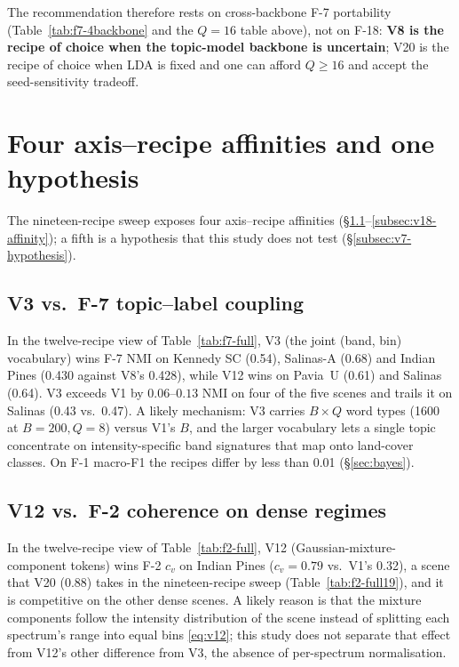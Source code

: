 \documentclass[journal,a4paper,10pt]{IEEEtran}
\begin{document}
The recommendation therefore rests on cross-backbone F-7 portability
(Table~\ref{tab:f7-4backbone} and the $Q = 16$ table above), not on
F-18: \textbf{V8 is the recipe of choice when the topic-model backbone
is uncertain}; V20 is the recipe of choice when LDA is fixed and one
can afford $Q \geq 16$ and accept the seed-sensitivity tradeoff.

\section{Four axis--recipe affinities and one hypothesis}\label{sec:affinities}

The nineteen-recipe sweep exposes four axis--recipe
affinities (\S\ref{subsec:v3-affinity}--\ref{subsec:v18-affinity}); a
fifth is a hypothesis that this study does not test
(\S\ref{subsec:v7-hypothesis}).

\subsection{V3 vs.\ F-7 topic--label coupling}
\label{subsec:v3-affinity}
In the twelve-recipe view of Table~\ref{tab:f7-full}, V3 (the joint
(band, bin) vocabulary) wins F-7 NMI on Kennedy SC (0.54), Salinas-A
(0.68) and Indian Pines (0.430 against V8's 0.428), while V12 wins on
Pavia~U (0.61) and Salinas (0.64). V3 exceeds V1 by $0.06$--$0.13$ NMI
on four of the five scenes and trails it on Salinas (0.43 vs.\ 0.47).
A likely mechanism: V3 carries
$B \times Q$ word types (1600 at $B=200, Q=8$) versus V1's $B$, and
the larger vocabulary lets a single topic concentrate on
intensity-specific band signatures that map onto land-cover classes.
On F-1 macro-F1 the recipes differ by less than 0.01
(\S\ref{sec:bayes}).

\subsection{V12 vs.\ F-2 coherence on dense regimes}
In the twelve-recipe view of Table~\ref{tab:f2-full}, V12
(Gaussian-mixture-component tokens) wins F-2 $c_v$ on Indian Pines
($c_v = 0.79$ vs.\ V1's 0.32), a scene that V20 (0.88) takes in the
nineteen-recipe sweep (Table~\ref{tab:f2-full19}), and it is
competitive on the other dense scenes. A likely reason is that the
mixture components follow the intensity distribution of the scene
instead of splitting each spectrum's range into equal bins
\eqref{eq:v12}; this study does not separate that effect from V12's
other difference from V3, the absence of per-spectrum normalisation.
\end{document}
